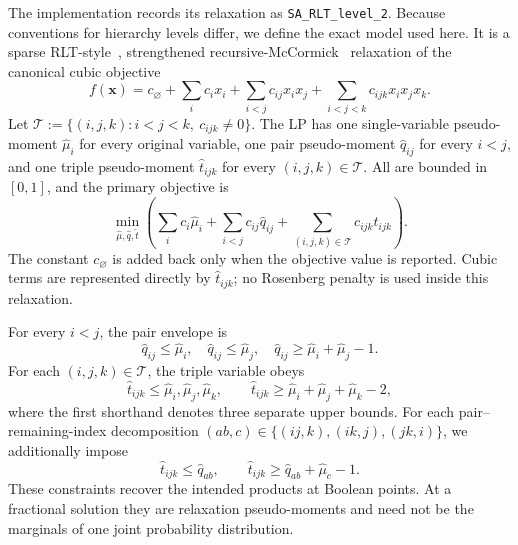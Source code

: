 \documentclass[a4paper,onecolumn,11pt,unpublished]{quantumarticle}
\theoremstyle{remark}
\begin{document}
The implementation records its relaxation as \texttt{SA\_RLT\_level\_2}.
Because conventions for hierarchy levels differ, we define the exact model
used here.  It is a sparse RLT-style~\cite{SheraliAdams1990}, strengthened
recursive-McCormick~\cite{McCormick1976} relaxation of the canonical
cubic objective
\begin{equation}
  f(\bm x)=c_{\varnothing}
  +\sum_i c_i x_i
  +\sum_{i<j}c_{ij}x_ix_j
  +\sum_{i<j<k}c_{ijk}x_ix_jx_k.
  \label{eq:experimental-rlt-canonical}
\end{equation}
Let $\mathcal T:=\{(i,j,k):i<j<k,\ c_{ijk}\neq0\}$.  The LP has one
single-variable pseudo-moment $\widehat\mu_i$ for every original variable, one
pair pseudo-moment $\widehat q_{ij}$ for every $i<j$, and one triple
pseudo-moment $\widehat t_{ijk}$ for every $(i,j,k)\in\mathcal T$.  All are
bounded in $[0,1]$, and the primary objective is
\begin{equation}
  \min_{\widehat\mu,\widehat q,\widehat t}
  \left(
    \sum_i c_i\widehat\mu_i
    +\sum_{i<j}c_{ij}\widehat q_{ij}
    +\sum_{(i,j,k)\in\mathcal T}c_{ijk}\widehat t_{ijk}
  \right).
  \label{eq:experimental-rlt-objective}
\end{equation}
The constant $c_{\varnothing}$ is added back only when the objective value is
reported.  Cubic terms are represented directly by $\widehat t_{ijk}$; no
Rosenberg penalty is used inside this relaxation.

For every $i<j$, the pair envelope is
\begin{equation}
  \widehat q_{ij}\leq\widehat\mu_i,
  \quad
  \widehat q_{ij}\leq\widehat\mu_j,
  \quad
  \widehat q_{ij}\geq\widehat\mu_i+\widehat\mu_j-1.
  \label{eq:experimental-rlt-pair}
\end{equation}
For each $(i,j,k)\in\mathcal T$, the triple variable obeys
\begin{equation}
  \widehat t_{ijk}\leq
  \widehat\mu_i,\widehat\mu_j,\widehat\mu_k,
  \qquad
  \widehat t_{ijk}\geq
  \widehat\mu_i+\widehat\mu_j+\widehat\mu_k-2,
  \label{eq:experimental-rlt-triple-single}
\end{equation}
where the first shorthand denotes three separate upper bounds.  For each
pair--remaining-index decomposition
$(ab,c)\in\{(ij,k),(ik,j),(jk,i)\}$, we additionally impose
\begin{equation}
  \widehat t_{ijk}\leq\widehat q_{ab},
  \qquad
  \widehat t_{ijk}\geq\widehat q_{ab}+\widehat\mu_c-1.
  \label{eq:experimental-rlt-triple-pair}
\end{equation}
These constraints recover the intended products at Boolean points.  At a
fractional solution they are relaxation pseudo-moments and need not be the
marginals of one joint probability distribution.
\end{document}
